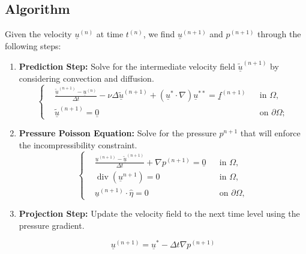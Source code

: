 \documentclass[11pt,a4paper]{article}
\renewcommand{\vec}[1]{\underline{#1}} %
\DeclareMathOperator{\Div}{div}
\begin{document}
\subsection{Algorithm}
Given the velocity $\vec{u}^{(n)}$ at time $t^{(n)}$, we find $\vec{u}^{(n+1)}$ and $p^{(n+1)}$ through the following steps:
\begin{enumerate}
    \item \textbf{Prediction Step:} Solve for the intermediate velocity field $\tilde{\vec{u}}^{(n+1)}$ by considering convection and diffusion.
    \begin{equation}
        \label{eq:chorin_step_1}
        \left\{ \begin{aligned}
            &\frac{\tilde{\vec{u}}^{(n+1)} - \vec{u}^{(n)}}{\Delta t} - \nu \Delta \tilde{\vec{u}}^{(n+1)} + (\vec{u}^* \cdot \nabla)\vec{u}^{**} = \vec{f}^{(n+1)} && \text{in } \Omega, \\
            &\tilde{\vec{u}}^{(n+1)} = \vec{0} && \text{on } \partial\Omega;
        \end{aligned} \right.
    \end{equation}
    
    \item \textbf{Pressure Poisson Equation:} Solve for the pressure $p^{n+1}$ that will enforce the incompressibility constraint.
    \begin{equation}
        \label{eq:chorin_step_2}
        \left\{ \begin{aligned}
            &\frac{\vec{u}^{(n+1)} - \tilde{\vec{u}}^{(n+1)}}{\Delta t} + \nabla p^{(n+1)} = \vec{0} && \text{in } \Omega, \\
            &\Div \left( \vec{u}^{n+1} \right) = 0 && \text{in } \Omega, \\
            &\vec{u}^{(n+1)} \cdot \hat{\eta} = 0 && \text{on } \partial\Omega,
        \end{aligned} \right.
    \end{equation}
    
    \item \textbf{Projection Step:} Update the velocity field to the next time level using the pressure gradient.

    \begin{tcolorbox}[colback = bluePoli!10, colframe=bluePoli]
    \begin{equation}
        \vec{u}^{(n+1)} = \vec{u}^* - \Delta t \nabla p^{(n+1)}
    \end{equation}
\end{tcolorbox}
\end{enumerate}
\end{document}

